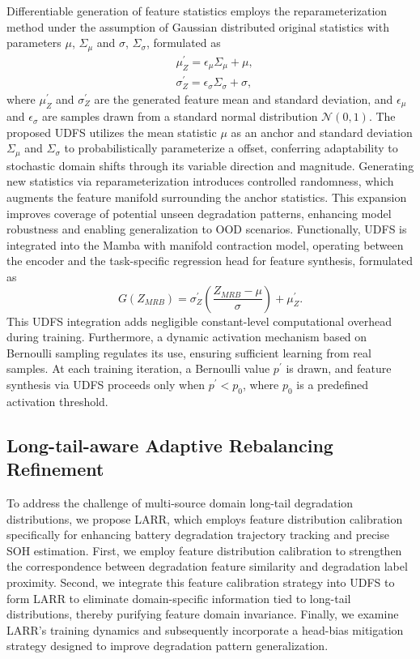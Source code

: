 \documentclass[lettersize,journal]{IEEEtran}
\begin{document}
Differentiable generation of feature statistics employs the reparameterization method under the assumption of Gaussian distributed original statistics with parameters $\mu$, $\Sigma_{\mu}$ and $\sigma$, $\Sigma_{\sigma}$, formulated as
\begin{align}
    & \mu_{Z}^{\prime}=\epsilon_{\mu}\Sigma_{\mu}+\mu,  \\
    & \sigma_{Z}^{\prime}=\epsilon_{\sigma}\Sigma_{\sigma}+\sigma, 
\end{align}
where $\mu_{Z}^{\prime}$ and $\sigma_{Z}^{\prime}$ are the generated feature mean and standard deviation, and $\epsilon_{\mu}$ and $\epsilon_{\sigma}$ are samples drawn from a standard normal distribution $\mathcal{N}(0, 1)$.
% 
The proposed UDFS utilizes the mean statistic $\mu$ as an anchor and standard deviation $\Sigma_{\mu}$ and $\Sigma_{\sigma}$ to probabilistically parameterize a offset, conferring adaptability to stochastic domain shifts through its variable direction and magnitude. Generating new statistics via reparameterization introduces controlled randomness, which augments the feature manifold surrounding the anchor statistics. This expansion improves coverage of potential unseen degradation patterns, enhancing model robustness and enabling generalization to OOD scenarios.
% 
Functionally, UDFS is integrated into the Mamba with manifold contraction model, operating between the encoder and the task-specific regression head for feature synthesis, formulated as
\begin{equation}
    G(Z_{MRB}) = \sigma_{Z}^{\prime}\left(\frac{Z_{MRB} - \mu}{\sigma}\right) + \mu_{Z}^{\prime}.
    \label{UDFS}
\end{equation}
This UDFS integration adds negligible constant-level computational overhead during training.
Furthermore, a dynamic activation mechanism based on Bernoulli sampling regulates its use, ensuring sufficient learning from real samples. At each training iteration, a Bernoulli value $p^{\prime}$ is drawn, and feature synthesis via UDFS proceeds only when $p^{\prime} < p_{0}$, where $p_{0}$ is a predefined activation threshold.

\subsection{Long-tail-aware Adaptive Rebalancing Refinement}\label{susbec:LARR}

To address the challenge of multi-source domain long-tail degradation distributions, we propose LARR, which employs feature distribution calibration specifically for enhancing battery degradation trajectory tracking and precise SOH estimation.
First, we employ feature distribution calibration to strengthen the correspondence between degradation feature similarity and degradation label proximity.
Second, we integrate this feature calibration strategy into UDFS to form LARR to eliminate domain-specific information tied to long-tail distributions, thereby purifying feature domain invariance.
Finally, we examine LARR's training dynamics and subsequently incorporate a head-bias mitigation strategy designed to improve degradation pattern generalization.
\end{document}
